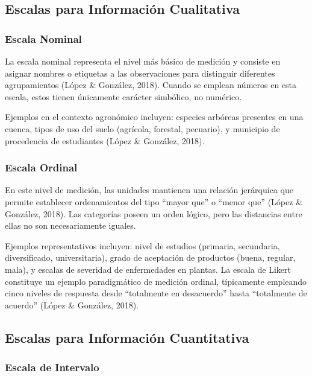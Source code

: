\documentclass[
  spanish,
  letterpaper,
]{book}
\begin{document}
\subsection{Escalas para Información
Cualitativa}\label{escalas-para-informaciuxf3n-cualitativa}

\subsubsection{Escala Nominal}\label{escala-nominal}

La escala nominal representa el nivel más básico de medición y consiste
en asignar nombres o etiquetas a las observaciones para distinguir
diferentes agrupamientos (López \& González, 2018). Cuando se emplean
números en esta escala, estos tienen únicamente carácter simbólico, no
numérico.

Ejemplos en el contexto agronómico incluyen: especies arbóreas presentes
en una cuenca, tipos de uso del suelo (agrícola, forestal, pecuario), y
municipio de procedencia de estudiantes (López \& González, 2018).

\subsubsection{Escala Ordinal}\label{escala-ordinal}

En este nivel de medición, las unidades mantienen una relación
jerárquica que permite establecer ordenamientos del tipo ``mayor que'' o
``menor que'' (López \& González, 2018). Las categorías poseen un orden
lógico, pero las distancias entre ellas no son necesariamente iguales.

Ejemplos representativos incluyen: nivel de estudios (primaria,
secundaria, diversificado, universitaria), grado de aceptación de
productos (buena, regular, mala), y escalas de severidad de enfermedades
en plantas. La escala de Likert constituye un ejemplo paradigmático de
medición ordinal, típicamente empleando cinco niveles de respuesta desde
``totalmente en desacuerdo'' hasta ``totalmente de acuerdo'' (López \&
González, 2018).

\subsection{Escalas para Información
Cuantitativa}\label{escalas-para-informaciuxf3n-cuantitativa}

\subsubsection{Escala de Intervalo}\label{escala-de-intervalo}
\end{document}
